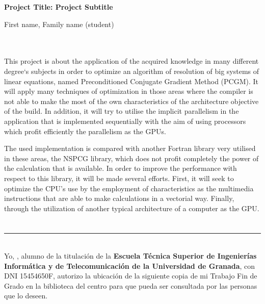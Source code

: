 \thispagestyle{empty}


\begin{center}
{\large\bfseries Project Title: Project Subtitle}\\
\end{center}
\begin{center}
First name, Family name (student)\\
\end{center}

\\

\vspace{0.7cm}
\\

This project is about the application of the acquired knowledge in many different degree`s subjects in order to optimize an algorithm of resolution of big systems of linear equations, named Preconditioned Conjugate Gradient Method (PCGM). It will apply many techniques of optimization in those areas where the compiler is not able to make the most of the own characteristics of the architecture objective of the build. In addition, it will try to utilise the implicit parallelism in the application that is implemented sequentially with the aim of using processors which profit efficiently the parallelism as the GPUs.

The used implementation is compared with another Fortran library very utilised in these areas, the NSPCG library, which does not profit completely the power of the calculation that is available. In order to improve the performance with respect to this library, it will be made several efforts. First, it will seek to optimize the CPU’s use by the employment of characteristics as the multimedia instructions that are able to make calculations in a vectorial way. Finally, through the utilization of another typical architecture of a computer as the GPU.

\chapter*{}
\thispagestyle{empty}

\noindent\rule[-1ex]{\textwidth}{2pt}\\[4.5ex]

Yo, \textbf{\myName}, alumno de la titulación \myDegree de la \textbf{Escuela Técnica Superior
de Ingenierías Informática y de Telecomunicación de la Universidad de Granada}, con DNI 15454650F, autorizo la
ubicación de la siguiente copia de mi Trabajo Fin de Grado en la biblioteca del centro para que pueda ser
consultada por las personas que lo deseen.

